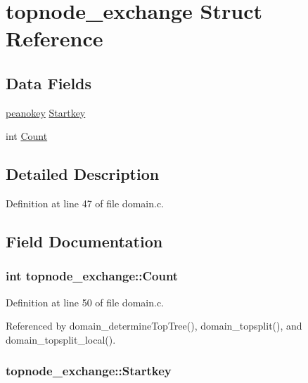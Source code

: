 \hypertarget{structtopnode__exchange}{
\section{topnode\_\-exchange Struct Reference}
\label{structtopnode__exchange}
}
\subsection*{Data Fields}
\begin{DoxyCompactItemize}
\item 
\hyperlink{allvars_8h_a63f10772bd5776dcb4b6301f425e0d26}{peanokey} \hyperlink{structtopnode__exchange_a1320a6ec4ba632909af0c092bd7735b4}{Startkey}
\item 
int \hyperlink{structtopnode__exchange_a8c37f88a4fac1e60c0132abfc976ce70}{Count}
\end{DoxyCompactItemize}


\subsection{Detailed Description}


Definition at line 47 of file domain.c.



\subsection{Field Documentation}
\hypertarget{structtopnode__exchange_a8c37f88a4fac1e60c0132abfc976ce70}{
\subsubsection[{Count}]{\setlength{\rightskip}{0pt plus 5cm}int {\bf topnode\_\-exchange::Count}}}
\label{structtopnode__exchange_a8c37f88a4fac1e60c0132abfc976ce70}


Definition at line 50 of file domain.c.



Referenced by domain\_\-determineTopTree(), domain\_\-topsplit(), and domain\_\-topsplit\_\-local().

\hypertarget{structtopnode__exchange_a1320a6ec4ba632909af0c092bd7735b4}{
\subsubsection[{Startkey}]{ {\bf topnode\_\-exchange::Startkey}}}
\label{structtopnode__exchange_a1320a6ec4ba632909af0c092bd7735b4}


